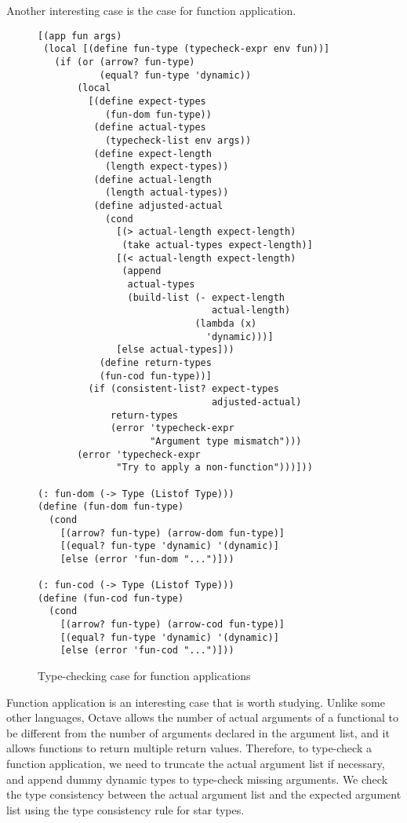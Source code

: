 Another interesting case is the case for function application.

\begin{figure}[h]
    \begin{lstlisting}[language=racket]
[(app fun args)
 (local [(define fun-type (typecheck-expr env fun))]
   (if (or (arrow? fun-type)
           (equal? fun-type 'dynamic))
       (local
         [(define expect-types
            (fun-dom fun-type))
          (define actual-types
            (typecheck-list env args))
          (define expect-length
            (length expect-types))
          (define actual-length
            (length actual-types))
          (define adjusted-actual
            (cond
              [(> actual-length expect-length)
               (take actual-types expect-length)]
              [(< actual-length expect-length)
               (append
                actual-types
                (build-list (- expect-length
                               actual-length)
                            (lambda (x)
                              'dynamic)))]
              [else actual-types]))
           (define return-types
           (fun-cod fun-type))]
         (if (consistent-list? expect-types
                               adjusted-actual)
             return-types
             (error 'typecheck-expr
                    "Argument type mismatch")))
       (error 'typecheck-expr
              "Try to apply a non-function")))]))

(: fun-dom (-> Type (Listof Type)))
(define (fun-dom fun-type)
  (cond
    [(arrow? fun-type) (arrow-dom fun-type)]
    [(equal? fun-type 'dynamic) '(dynamic)]
    [else (error 'fun-dom "...")]))

(: fun-cod (-> Type (Listof Type)))
(define (fun-cod fun-type)
  (cond
    [(arrow? fun-type) (arrow-cod fun-type)]
    [(equal? fun-type 'dynamic) '(dynamic)]
    [else (error 'fun-cod "...")]))
    \end{lstlisting}
    \caption[]{Type-checking case for function applications}
    \label{fig:app}
\end{figure}

Function application is an interesting case that is worth studying. Unlike some other languages, Octave allows the number of actual arguments of a functional to be different from the number of arguments declared in the argument list, and it allows functions to return multiple return values. Therefore, to type-check a function application, we need to truncate the actual argument list if necessary, and append dummy dynamic types to type-check missing arguments. We check the type consistency between the actual argument list and the expected argument list using the type consistency rule for star types.

